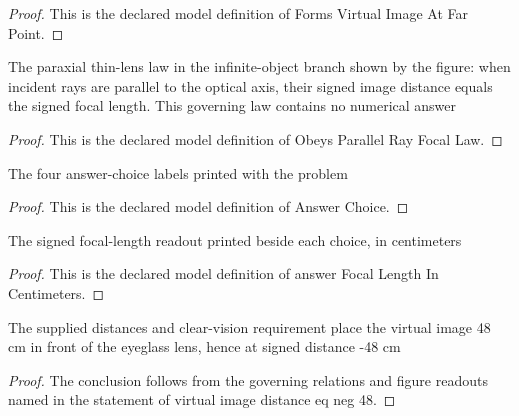 \begin{proof}
  This is the declared model definition of Forms Virtual Image At Far Point.
\end{proof}
\begin{definition}
  \label{def:physics:phyx-mini-0045:phyxminiproblems-problemphyxmini0045-obeysparallelrayfocallaw}
  The paraxial thin-lens law in the infinite-object branch shown by the figure: when incident rays are parallel to the optical axis, their signed image distance equals the signed focal length. This governing law contains no numerical answer
\end{definition}
\begin{proof}
  This is the declared model definition of Obeys Parallel Ray Focal Law.
\end{proof}
\begin{definition}
  \label{def:physics:phyx-mini-0045:phyxminiproblems-problemphyxmini0045-answerchoice}
  The four answer-choice labels printed with the problem
\end{definition}
\begin{proof}
  This is the declared model definition of Answer Choice.
\end{proof}
\begin{definition}
  \label{def:physics:phyx-mini-0045:phyxminiproblems-problemphyxmini0045-answerfocallengthincentimeters}
  The signed focal-length readout printed beside each choice, in centimeters
\end{definition}
\begin{proof}
  This is the declared model definition of answer Focal Length In Centimeters.
\end{proof}
\begin{lemma}
  \label{lem:physics:phyx-mini-0045:phyxminiproblems-problemphyxmini0045-virtual-image-distance-eq-neg-48}
  The supplied distances and clear-vision requirement place the virtual image 48 cm in front of the eyeglass lens, hence at signed distance -48 cm
\end{lemma}
\begin{proof}
  The conclusion follows from the governing relations and figure readouts named in the statement of virtual image distance eq neg 48.
\end{proof}
